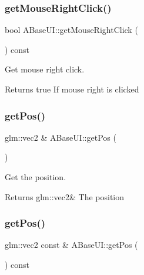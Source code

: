 \subsubsection{\texorpdfstring{get\+Mouse\+Right\+Click()}{getMouseRightClick()}}
{\footnotesize\ttfamily bool A\+Base\+U\+I\+::get\+Mouse\+Right\+Click (\begin{DoxyParamCaption}{ }\end{DoxyParamCaption}) const\hspace{0.3cm}{\ttfamily [virtual]}}



Get mouse right click. 

\begin{DoxyReturn}{Returns}
true If mouse right is clicked 
\end{DoxyReturn}
\mbox{\label{class_a_base_u_i_ad875929db54fdd563cbb037cade3c009}} 
\subsubsection{\texorpdfstring{get\+Pos()}{getPos()}\hspace{0.1cm}{\footnotesize\ttfamily [1/2]}}
{\footnotesize\ttfamily glm\+::vec2 \& A\+Base\+U\+I\+::get\+Pos (\begin{DoxyParamCaption}{ }\end{DoxyParamCaption})\hspace{0.3cm}{\ttfamily [virtual]}}



Get the position. 

\begin{DoxyReturn}{Returns}
glm\+::vec2\& The position 
\end{DoxyReturn}
\mbox{\label{class_a_base_u_i_a4a8695c227cd33f47536624a55b82381}} 
\subsubsection{\texorpdfstring{get\+Pos()}{getPos()}\hspace{0.1cm}{\footnotesize\ttfamily [2/2]}}
{\footnotesize\ttfamily glm\+::vec2 const  \& A\+Base\+U\+I\+::get\+Pos (\begin{DoxyParamCaption}{ }\end{DoxyParamCaption}) const\hspace{0.3cm}{\ttfamily [virtual]}}



